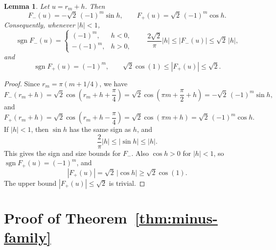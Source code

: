 \documentclass[reqno]{amsart}
\theoremstyle{definition}
\theoremstyle{plain}
\newtheorem{lemma}      {Lemma}
\theoremstyle{remark}
\numberwithin{equation}{section}
\newcommand{\sgn}{\operatorname{sgn}}
\begin{document}
\begin{lemma}\label{lem:trig-near-r}
Let $u=r_m+h$. Then
\[
  F_-(u)=-\sqrt 2\,(-1)^m\sin h,
  \qquad
  F_+(u)=\sqrt 2\,(-1)^m\cos h.
\]
Consequently, whenever $|h|<1$,
\[
  \sgn F_-(u)=
  \begin{cases}
    (-1)^m,& h<0,\\
    -(-1)^m,& h>0,
  \end{cases}
  \qquad
  \frac{2\sqrt 2}{\pi}|h|\le |F_-(u)|\le \sqrt 2\,|h|,
\]
and
\[
  \sgn F_+(u)=(-1)^m,
  \qquad
  \sqrt 2\cos(1)\le |F_+(u)|\le \sqrt 2.
\]
\end{lemma}

\begin{proof}
Since $r_m=\pi(m+1/4)$, we have
\[
  F_-(r_m+h)=\sqrt 2\cos\left(r_m+h+\frac{\pi}{4}\right)
  =\sqrt 2\cos\left(\pi m+\frac{\pi}{2}+h\right)
  =-\sqrt 2\,(-1)^m\sin h,
\]
and
\[
  F_+(r_m+h)=\sqrt 2\cos\left(r_m+h-\frac{\pi}{4}\right)
  =\sqrt 2\cos(\pi m+h)
  =\sqrt 2\,(-1)^m\cos h.
\]
If $|h|<1$, then $\sin h$ has the same sign as $h$, and
\[
  \frac{2}{\pi}|h|\le |\sin h|\le |h|.
\]
This gives the sign and size bounds for $F_-$. Also $\cos h>0$ for $|h|<1$, so $\sgn F_+(u)=(-1)^m$, and
\[
  |F_+(u)|=\sqrt 2\,|\cos h|\ge \sqrt 2\cos(1).
\]
The upper bound $|F_+(u)|\le \sqrt 2$ is trivial.
\end{proof}

\section{Proof of Theorem~\ref{thm:minus-family}}\label{sec:proof-minus-family}
\end{document}
